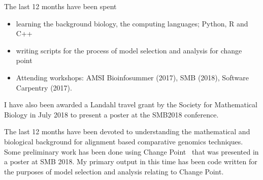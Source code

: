 The last 12 months have been spent 
    \begin{itemize}
        \item learning the background biology, the computing languages; Python, R and C++
        \item writing scripts for the process of model selection and analysis for change point
        \item Attending workshops: AMSI Bioinfosummer (2017), SMB (2018), Software Carpentry (2017).
    \end{itemize}

I have also been awarded a Landahl travel grant by the Society for Mathematical Biology in July 2018 to present a poster at the SMB2018 conference.

The last 12 months have been devoted to understanding the mathematical and biological background for alignment based comparative genomics techniques. Some preliminary work has been done using Change Point~\cite{keith2006segmenting} that was presented in a poster at SMB 2018. My primary output in this time has been code written for the purposes of model selection and analysis relating to Change Point.  